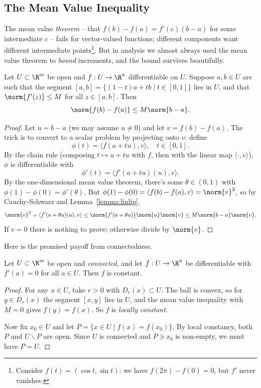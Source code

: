 \subsection{The Mean Value Inequality}

The mean value \emph{theorem} -- that $f(b) - f(a) = f'(c)(b - a)$ for some intermediate $c$ -- fails for vector-valued functions; different components want different intermediate points\footnote{Consider $f(t) = (\cos t, \sin t)$: we have $f(2\pi) - f(0) = 0$, but $f'$ never vanishes.}. But in analysis we almost always used the mean value theorem to \emph{bound} increments, and the bound survives beautifully.

\begin{theorem}\label{thm:mvi}
    Let $U \subset \R^m$ be open and $f: U \rightarrow \R^n$ differentiable on $U$. Suppose $a, b \in U$ are such that the segment $[a, b] = \{(1 - t)a + tb \mid t \in [0, 1]\}$ lies in $U$, and that $\norm{f'(z)} \leq M$ for all $z \in [a, b]$. Then
    $$
    \norm{f(b) - f(a)} \leq M\norm{b - a}.
    $$
\end{theorem}
\begin{proof}
    Let $u = b - a$ (we may assume $u \neq 0$) and let $v = f(b) - f(a)$. The trick is to convert to a scalar problem by projecting onto $v$: define
    $$
    \phi(t) = \langle f(a + tu), v\rangle, \quad t \in [0, 1].
    $$
    By the chain rule (composing $t \mapsto a + tu$ with $f$, then with the linear map $\langle \cdot, v \rangle$), $\phi$ is differentiable with
    $$
    \phi'(t) = \langle f'(a + tu)(u), v\rangle.
    $$
    By the one-dimensional mean value theorem, there's some $\theta \in (0, 1)$ with $\phi(1) - \phi(0) = \phi'(\theta)$. But $\phi(1) - \phi(0) = \langle f(b) - f(a), v\rangle = \norm{v}^2$, so by Cauchy-Schwarz and Lemma~\ref{lemma:linlip},
    $$
    \norm{v}^2 = \langle f'(a + \theta u)(u), v\rangle \leq \norm{f'(a + \theta u)}\norm{u}\norm{v} \leq M \norm{b - a} \norm{v}.
    $$
    If $v = 0$ there is nothing to prove; otherwise divide by $\norm{v}$.
\end{proof}

Here is the promised payoff from connectedness.

\begin{corollary}
    Let $U \subset \R^m$ be open and \emph{connected}, and let $f: U \rightarrow \R^n$ be differentiable with $f'(a) = 0$ for all $a \in U$. Then $f$ is constant.
\end{corollary}
\begin{proof}
    For any $x \in U$, take $r > 0$ with $D_r(x) \subset U$. The ball is convex, so for $y \in D_r(x)$ the segment $[x, y]$ lies in $U$, and the mean value inequality with $M = 0$ gives $f(y) = f(x)$. So $f$ is \emph{locally constant}.

    Now fix $x_0 \in U$ and let $P = \{x \in U \mid f(x) = f(x_0)\}$. By local constancy, both $P$ and $U \backslash P$ are open. Since $U$ is connected and $P \ni x_0$ is non-empty, we must have $P = U$.
\end{proof}


